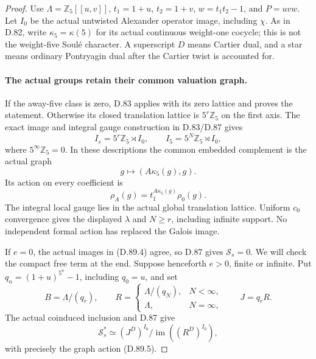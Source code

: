 \begin{proof}
Use \(\Lambda=\mathbb Z_5[[u,v]]\), \(t_1=1+u\),
\(t_2=1+v\), \(w=t_1t_2-1\), and \(P=uvw\).
Let \(I_0\) be the actual untwisted Alexander operator image,
including \(\chi\). As in D.82, write \(\kappa_5=\kappa(5)\)
for its actual continuous weight-one cocycle; this is not the
weight-five Soul\'e character. A superscript \(D\) means
Cartier dual, and a star means ordinary Pontryagin dual after
the Cartier twist is accounted for.

\paragraph{The actual groups retain their common valuation graph.}
If the away-five class is zero, D.83 applies with its zero
lattice and proves the statement. Otherwise its closed
translation lattice is \(5^r\mathbb Z_5\) on the first axis.
The exact image and integral gauge construction in D.83/D.87
gives
\[
 I_s=5^r\mathbb Z_5\rtimes I_0,
 \qquad I_5=5^N\mathbb Z_5\rtimes I_0,                  \tag{D.89.4}
\]
where \(5^\infty\mathbb Z_5=0\). In these descriptions
the common embedded complement is the actual graph
\[
             g\longmapsto(A\kappa_5(g),g).
\]
Its action on every coefficient is
\[
                \rho_A(g)=t_1^{A\kappa_5(g)}\rho_0(g).
                                                               \tag{D.89.5}
\]
The integral local gauge lies in the actual global translation
lattice. Uniform \(c_0\) convergence gives the displayed
\(\lambda\) and \(N\ge r\), including infinite support.
No independent formal action has replaced the Galois image.

If \(e=0\), the actual images in (D.89.4) agree, so D.87
gives \(\mathcal S_s=0\). We will check the compact free
term at the end. Suppose henceforth \(e>0\), finite or infinite.
Put \(q_n=(1+u)^{5^n}-1\), including \(q_0=u\), and set
\[
 B=\Lambda/(q_r),\qquad
 R=\begin{cases}\Lambda/(q_N),&N<\infty,\\
                 \Lambda,&N=\infty,\end{cases}
 \qquad J=q_rR.                                         \tag{D.89.6}
\]
The actual coinduced inclusion and D.87 give
\[
 \mathcal S_s^*\simeq
       (J^D)^{I_0}/\operatorname{im}((R^D)^{I_0}),        \tag{D.89.7}
\]
with precisely the graph action (D.89.5).


\end{proof}
